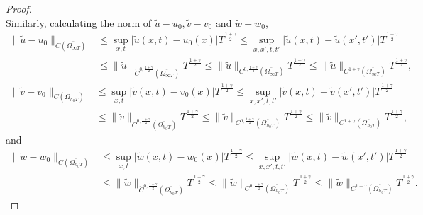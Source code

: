 \documentclass[11pt]{amsart}
\numberwithin{equation}{section}
\theoremstyle{plain}
\theoremstyle{definition}
\begin{document}
\begin{proof}
\begin{equation}
		\end{equation}
		Similarly, calculating the norm of $\tilde u-u_0, \tilde v-v_0 \text{ and }\tilde w-w_0$,
		\begin{equation} \label{u holder}
			\begin{aligned}
				\lVert \widetilde u-u_0 \rVert_{C(\overline{\Omega_{\infty T}})}&\leq \underset{x,t}{\sup}\lvert \widetilde u(x,t) -u_0(x)\rvert T^{\frac{1+\gamma}{2}}\leq \underset{x,x',t,t'}{\sup}\lvert \widetilde u(x,t)-\widetilde u(x',t')\rvert T^{\frac{1+\gamma}{2}}\\
				&\leq\lVert \widetilde u \rVert_{\dot{C}^{0,\frac{1+\gamma}{2}}(\overline{\Omega_{\infty T}})}T^{\frac{1+\gamma}{2}}\leq \lVert \widetilde u \rVert_{C^{0,\frac{1+\gamma}{2}}(\overline{\Omega_{\infty T}})}T^{\frac{1+\gamma}{2}} \leq \lVert \widetilde u \rVert_{C^{1+\gamma}(\overline{\Omega_{\infty T}})}T^{\frac{1+\gamma}{2}},
			\end{aligned}
		\end{equation}
		\begin{equation} \label{v holder}
			\begin{aligned}
				\lVert \widetilde v-v_0 \rVert_{C(\overline{\Omega_{h_0 T}})}&\leq \underset{x,t}{\sup}\lvert \widetilde v(x,t) -v_0(x)\rvert T^{\frac{1+\gamma}{2}}\leq \underset{x,x',t,t'}{\sup}\lvert \widetilde v(x,t)-\widetilde v(x',t')\rvert T^{\frac{1+\gamma}{2}}\\
				&\leq\lVert \widetilde v \rVert_{\dot{C}^{0,\frac{1+\gamma}{2}}(\overline{\Omega_{h_0 T}})}T^{\frac{1+\gamma}{2}}\leq \lVert \widetilde v \rVert_{C^{0,\frac{1+\gamma}{2}}(\overline{\Omega_{h_0 T}})}T^{\frac{1+\gamma}{2}}\leq \lVert \widetilde v \rVert_{C^{1+\gamma}(\overline{\Omega_{h_0 T}})}T^{\frac{1+\gamma}{2}},
			\end{aligned}
		\end{equation}
		and
				\begin{equation} \label{w holder}
			\begin{aligned}
				\lVert \widetilde w-w_0 \rVert_{C(\overline{\Omega_{h_0 T}})}&\leq \underset{x,t}{\sup}\lvert \tilde w(x,t) -w_0(x)\rvert T^{\frac{1+\gamma}{2}}\leq \underset{x,x',t,t'}{\sup}\lvert \widetilde w(x,t)-\widetilde w(x',t')\rvert T^{\frac{1+\gamma}{2}}\\
				&\leq \lVert \widetilde w \rVert_{\dot{C}^{0,\frac{1+\gamma}{2}}(\overline{\Omega_{h_0 T}})}T^{\frac{1+\gamma}{2}}\leq \lVert \widetilde w \rVert_{C^{0,\frac{1+\gamma}{2}}(\overline{\Omega_{h_0 T}})}T^{\frac{1+\gamma}{2}}\leq \lVert \tilde w \rVert_{C^{1+\gamma}(\overline{\Omega_{h_0 T}})}T^{\frac{1+\gamma}{2}}.

\end{aligned}
\end{equation}
\end{proof}
\end{document}
